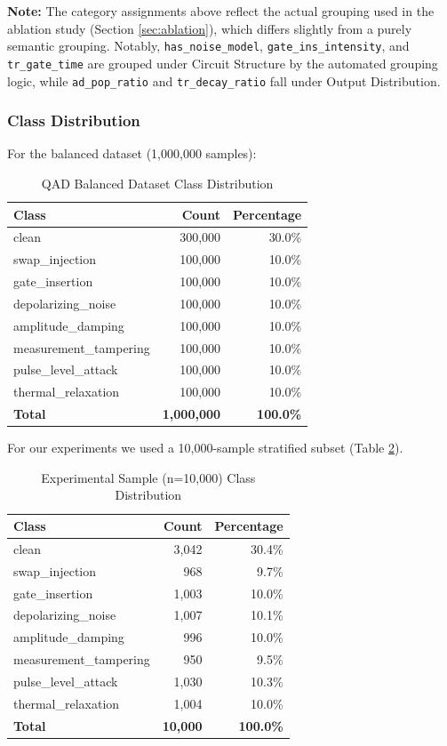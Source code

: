 \textbf{Note:} The category assignments above reflect the actual grouping used in the ablation study (Section \ref{sec:ablation}), which differs slightly from a purely semantic grouping. Notably, \texttt{has\_noise\_model}, \texttt{gate\_ins\_intensity}, and \texttt{tr\_gate\_time} are grouped under Circuit Structure by the automated grouping logic, while \texttt{ad\_pop\_ratio} and \texttt{tr\_decay\_ratio} fall under Output Distribution.

\subsubsection{Class Distribution}
For the balanced dataset (1,000,000 samples):

\begin{table}[H]
\centering
\caption{QAD Balanced Dataset Class Distribution}
\label{tab:qad_class_dist}
\begin{tabular}{lrr}
\toprule
\textbf{Class} & \textbf{Count} & \textbf{Percentage} \\
\midrule
clean & 300,000 & 30.0\% \\
swap\_injection & 100,000 & 10.0\% \\
gate\_insertion & 100,000 & 10.0\% \\
depolarizing\_noise & 100,000 & 10.0\% \\
amplitude\_damping & 100,000 & 10.0\% \\
measurement\_tampering & 100,000 & 10.0\% \\
pulse\_level\_attack & 100,000 & 10.0\% \\
thermal\_relaxation & 100,000 & 10.0\% \\
\midrule
\textbf{Total} & \textbf{1,000,000} & \textbf{100.0\%} \\
\bottomrule
\end{tabular}
\end{table}

For our experiments we used a 10,000-sample stratified subset (Table \ref{tab:our_sample_dist}).

\begin{table}[H]
\centering
\caption{Experimental Sample (n=10,000) Class Distribution}
\label{tab:our_sample_dist}
\begin{tabular}{lrr}
\toprule
\textbf{Class} & \textbf{Count} & \textbf{Percentage} \\
\midrule
clean & 3,042 & 30.4\% \\
swap\_injection & 968 & 9.7\% \\
gate\_insertion & 1,003 & 10.0\% \\
depolarizing\_noise & 1,007 & 10.1\% \\
amplitude\_damping & 996 & 10.0\% \\
measurement\_tampering & 950 & 9.5\% \\
pulse\_level\_attack & 1,030 & 10.3\% \\
thermal\_relaxation & 1,004 & 10.0\% \\
\midrule
\textbf{Total} & \textbf{10,000} & \textbf{100.0\%} \\
\bottomrule
\end{tabular}
\end{table}

